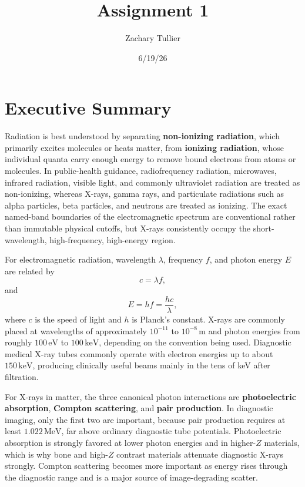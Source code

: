 \documentclass[12pt]{article}
\title{Assignment 1}
\author{Zachary Tullier}
\date{6/19/26}
\begin{document}
\maketitle

\section*{Executive Summary}

Radiation is best understood by separating \textbf{non-ionizing radiation}, which primarily excites molecules or heats matter, from \textbf{ionizing radiation}, whose individual quanta carry enough energy to remove bound electrons from atoms or molecules. In public-health guidance, radiofrequency radiation, microwaves, infrared radiation, visible light, and commonly ultraviolet radiation are treated as non-ionizing, whereas X-rays, gamma rays, and particulate radiations such as alpha particles, beta particles, and neutrons are treated as ionizing. The exact named-band boundaries of the electromagnetic spectrum are conventional rather than immutable physical cutoffs, but X-rays consistently occupy the short-wavelength, high-frequency, high-energy region.

For electromagnetic radiation, wavelength $\lambda$, frequency $f$, and photon energy $E$ are related by
\begin{equation}
    c = \lambda f,
\end{equation}
and
\begin{equation}
    E = hf = \frac{hc}{\lambda},
\end{equation}
where $c$ is the speed of light and $h$ is Planck's constant. X-rays are commonly placed at wavelengths of approximately $10^{-11}$ to $10^{-8}\,\mathrm{m}$ and photon energies from roughly $100\,\mathrm{eV}$ to $100\,\mathrm{keV}$, depending on the convention being used. Diagnostic medical X-ray tubes commonly operate with electron energies up to about $150\,\mathrm{keV}$, producing clinically useful beams mainly in the tens of keV after filtration.

For X-rays in matter, the three canonical photon interactions are \textbf{photoelectric absorption}, \textbf{Compton scattering}, and \textbf{pair production}. In diagnostic imaging, only the first two are important, because pair production requires at least $1.022\,\mathrm{MeV}$, far above ordinary diagnostic tube potentials. Photoelectric absorption is strongly favored at lower photon energies and in higher-$Z$ materials, which is why bone and high-$Z$ contrast materials attenuate diagnostic X-rays strongly. Compton scattering becomes more important as energy rises through the diagnostic range and is a major source of image-degrading scatter.
\end{document}
